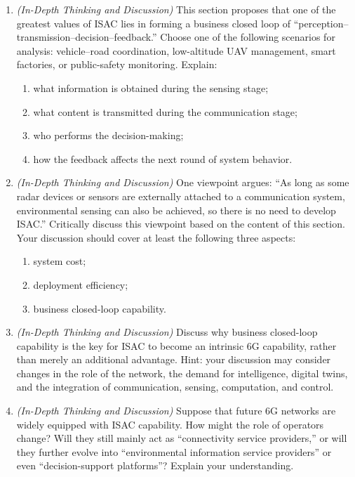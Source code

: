 \begin{enumerate}[label=\textbf{\arabic*.}, leftmargin=*]
    \item \textit{(In-Depth Thinking and Discussion)} This section proposes that one of the greatest values of ISAC lies in forming a business closed loop of ``perception--transmission--decision--feedback.'' Choose one of the following scenarios for analysis: vehicle--road coordination, low-altitude UAV management, smart factories, or public-safety monitoring. Explain:
    \begin{enumerate}[label=(\alph*)]
        \item what information is obtained during the sensing stage;
        \item what content is transmitted during the communication stage;
        \item who performs the decision-making;
        \item how the feedback affects the next round of system behavior.
    \end{enumerate}

    \item \textit{(In-Depth Thinking and Discussion)} One viewpoint argues: ``As long as some radar devices or sensors are externally attached to a communication system, environmental sensing can also be achieved, so there is no need to develop ISAC.'' Critically discuss this viewpoint based on the content of this section. Your discussion should cover at least the following three aspects:
    \begin{enumerate}[label=(\alph*)]
        \item system cost;
        \item deployment efficiency;
        \item business closed-loop capability.
    \end{enumerate}

    \item \textit{(In-Depth Thinking and Discussion)} Discuss why business closed-loop capability is the key for ISAC to become an intrinsic 6G capability, rather than merely an additional advantage. Hint: your discussion may consider changes in the role of the network, the demand for intelligence, digital twins, and the integration of communication, sensing, computation, and control.

    \item \textit{(In-Depth Thinking and Discussion)} Suppose that future 6G networks are widely equipped with ISAC capability. How might the role of operators change? Will they still mainly act as ``connectivity service providers,'' or will they further evolve into ``environmental information service providers'' or even ``decision-support platforms''? Explain your understanding.


\end{enumerate}

